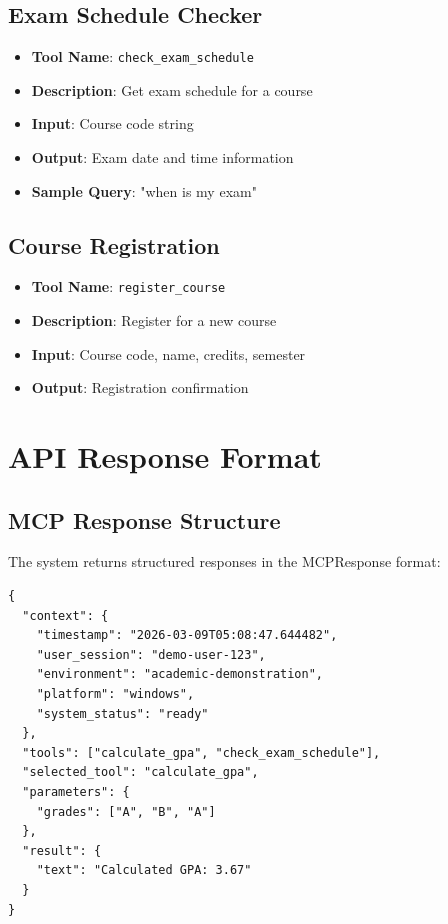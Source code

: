 \documentclass[12pt, a4paper]{report}
\begin{document}
\section{Exam Schedule Checker}
\begin{itemize}
    \item \textbf{Tool Name}: \texttt{check\_exam\_schedule}
    \item \textbf{Description}: Get exam schedule for a course
    \item \textbf{Input}: Course code string
    \item \textbf{Output}: Exam date and time information
    \item \textbf{Sample Query}: "when is my exam"
\end{itemize}

\section{Course Registration}
\begin{itemize}
    \item \textbf{Tool Name}: \texttt{register\_course}
    \item \textbf{Description}: Register for a new course
    \item \textbf{Input}: Course code, name, credits, semester
    \item \textbf{Output}: Registration confirmation
\end{itemize}

\chapter{API Response Format}

\section{MCP Response Structure}
The system returns structured responses in the MCPResponse format:

\begin{verbatim}
{
  "context": {
    "timestamp": "2026-03-09T05:08:47.644482",
    "user_session": "demo-user-123",
    "environment": "academic-demonstration",
    "platform": "windows",
    "system_status": "ready"
  },
  "tools": ["calculate_gpa", "check_exam_schedule"],
  "selected_tool": "calculate_gpa",
  "parameters": {
    "grades": ["A", "B", "A"]
  },
  "result": {
    "text": "Calculated GPA: 3.67"
  }
}
\end{verbatim}
\end{document}
